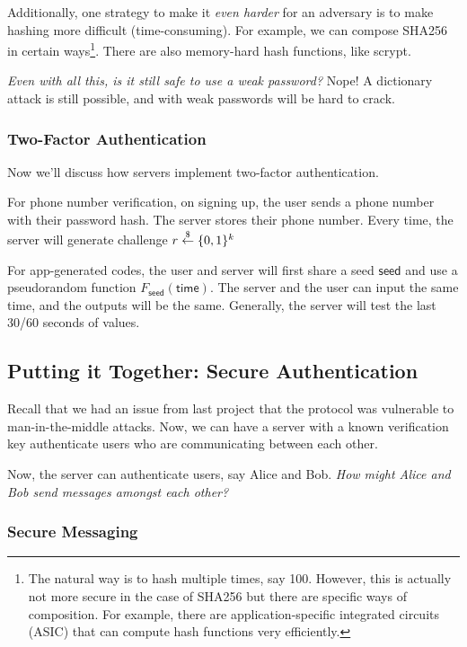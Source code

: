 Additionally, one strategy to make it \emph{even harder} for an adversary is to make hashing more difficult (time-consuming). For example, we can compose SHA256 in certain ways\footnote{The natural way is to hash multiple times, say 100. However, this is actually not more secure in the case of SHA256 but there are specific ways of composition. For example, there are application-specific integrated circuits (ASIC) that can compute hash functions very efficiently.}. There are also memory-hard hash functions, like scrypt.

\emph{Even with all this, is it still safe to use a weak password?} Nope! A dictionary attack is still possible, and with weak passwords will be hard to crack.

\subsubsection{Two-Factor Authentication}
Now we'll discuss how servers implement two-factor authentication.

For phone number verification, on signing up, the user sends a phone number with their password hash. The server stores their phone number. Every time, the server will generate challenge $r\overset{\$}{\leftarrow}\{0,1\}^k$

For app-generated codes, the user and server will first share a seed $\mathsf{seed}$ and use a pseudorandom function $F_\mathsf{seed}(\mathsf{time})$. The server and the user can input the same time, and the outputs will be the same. Generally, the server will test the last 30/60 seconds of values.


\subsection{Putting it Together: Secure Authentication}

Recall that we had an issue from last project that the protocol was vulnerable to man-in-the-middle attacks. Now, we can have a server with a known verification key authenticate users who are communicating between each other.


Now, the server can authenticate users, say Alice and Bob. \emph{How might Alice and Bob send messages amongst each other?}

\subsubsection{Secure Messaging}

